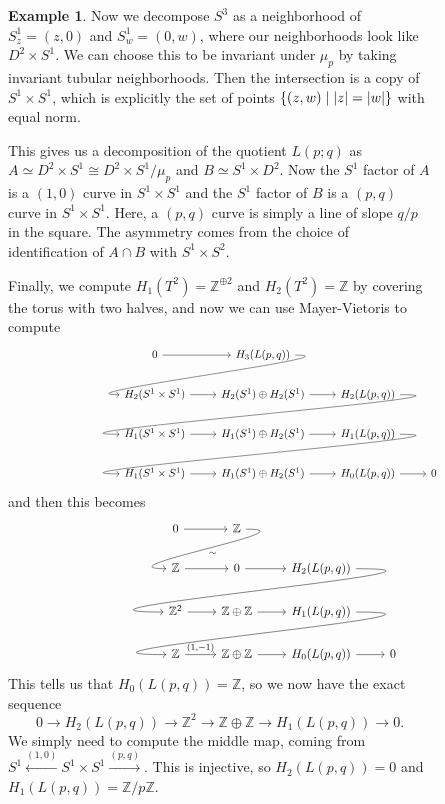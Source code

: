 \documentclass[leqno, openany]{memoir}
\theoremstyle{definition}
\newtheorem{exm}[thm]{Example}
\theoremstyle{remark}
\theoremstyle{plain}
\theoremstyle{definition}
\theoremstyle{remark}
\newcommand{\Z}{\mathbb{Z}}
\begin{document}
\begin{figure}[H]
\begin{exm}
    Now we decompose $S^3$ as a neighborhood of $S^1_z = (z,0)$ and $S^1_w =
    (0,w)$, where our neighborhoods look like $D^2 \times S^1$. We can choose
    this to be invariant under $\mu_p$ by taking invariant tubular
    neighborhoods. Then the intersection is a copy of $S^1 \times S^1$, which
    is explicitly the set of points $\qty{(z,w) \mid \abs{z} = \abs{w}}$ with
    equal norm.

    This gives us a decomposition of the quotient $L(p;q)$ as $A \simeq D^2
    \times S^1 \cong D^2 \times S^1 / \mu_p$ and $B \simeq S^1 \times D^2$. Now
    the $S^1$ factor of $A$ is a $(1,0)$ curve in $S^1 \times S^1$ and the
    $S^1$ factor of $B$ is a $(p,q)$ curve in $S^1 \times S^1$. Here, a $(p,q)$
    curve is simply a line of slope $q/p$ in the square. The asymmetry comes
    from the choice of identification of $A \cap B$ with $S^1 \times S^2$.

    Finally, we compute $H_1(T^2) = \Z^{\oplus 2}$ and $H_2(T^2) = \Z$ by
    covering the torus with two halves, and now we can use Mayer-Vietoris to
    compute \begin{equation*} \begin{tikzcd} 0 \arrow{r} & H_3(L(p,q))
        \arrow[out=0, in=180, looseness=1]{dl} \\ H_2(S^1 \times S^1) \arrow{r}
        & H_2(S^1) \oplus H_2(S^1) \arrow{r} & H_2(L(p,q)) \arrow[out=0,
        in=180, looseness=1]{dll} \\ H_1(S^1 \times S^1) \arrow{r} & H_1(S^1)
        \oplus H_2(S^1) \arrow{r} & H_1(L(p,q)) \arrow[out=0, in=180,
        looseness=1]{dll} \\ H_1(S^1 \times S^1) \arrow{r} & H_1(S^1) \oplus
        H_2(S^1) \arrow{r} & H_0(L(p,q)) \arrow{r}  & 0 \end{tikzcd}
        \end{equation*} and then this becomes \begin{equation*} \begin{tikzcd}
        0 \arrow{r} & \Z \arrow[out=0, in=180, looseness=2]{dl}{\sim} \\ \Z
        \arrow{r} & 0 \arrow{r} & H_2(L(p,q)) \arrow[out=0, in=180,
        looseness=2]{dll} \\ \Z^2 \arrow{r} & \Z \oplus \Z \arrow{r} &
        H_1(L(p,q)) \arrow[out=0, in=180, looseness=2]{dll} \\ \Z
    \arrow{r}{(1,-1)} & \Z \oplus \Z \arrow{r} & H_0(L(p,q)) \arrow{r}  & 0
\end{tikzcd} \end{equation*} This tells us that $H_0(L(p,q)) = \Z$, so we now
have the exact sequence \[ 0 \to H_2(L(p,q)) \to \Z^2 \to \Z \oplus \Z \to
H_1(L(p,q)) \to 0. \] We simply need to compute the middle map, coming from
$S^1 \xleftarrow{(1,0)} S^1 \times S^1 \xrightarrow{(p,q)}$. This is injective,
so $H_2(L(p,q)) = 0$ and $H_1(L(p,q)) = \Z/p\Z$.


\end{exm}
\end{figure}
\end{document}
